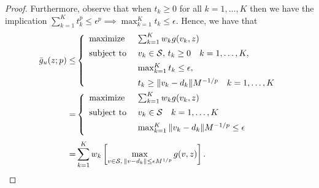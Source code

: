 \begin{proof}
  Furthermore, observe that when $t_k\geq 0$ for all $k=1,\dots, K$ then we have the implication $\sum_{k=1}^K t^p_k\leq \epsilon^p \implies \max_{k=1}^K t_k \leq \epsilon$. Hence, we have that
  \begin{align*}
    \bar{g}_u(z; p)
    \leq &
    \left\{
      \begin{array}{l@{~~~~}l}
				\mbox{maximize} & \sum_{k=1}^K w_k g(v_k, z) \\[0.5em]
        \mbox{subject to} & v_k\in \supp, \, t_k\geq 0 \quad k = 1,\dots,K,\\[0.5em]
             &  \max_{k=1}^K t_k \leq \epsilon,\\[0.5em]
             &  t_k\geq \norm{v_k-d_k} M^{-1/p} \quad k = 1,\dots,K
      \end{array}
           \right.\\
    = &    \left\{
      \begin{array}{l@{~~~~}l}
				\mbox{maximize} & \sum_{k=1}^K w_k g(v_k, z) \\[0.5em]
        \mbox{subject to} & v_k\in \supp\quad k = 1,\dots,K\\[0.5em]
             &  \max_{k=1}^K \norm{v_k-d_k} M^{-1/p} \leq \epsilon\\[0.5em]
      \end{array}
        \right.\\
    = &  \sum_{k=1}^K w_k \left[\max_{v\in \supp,\,\norm{v-d_k}\leq \epsilon M^{1/p}} g(v, z)\right].
  \end{align*}


\end{proof}
